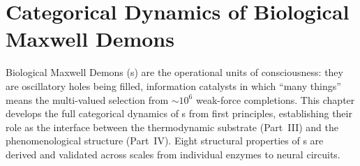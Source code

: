 \chapter{Categorical Dynamics of Biological Maxwell Demons}
\label{ch:biological_maxwell}


\begin{chapterabstract}
Biological Maxwell Demons (\BMD{}s) are the operational units of consciousness: they are oscillatory holes being filled, information catalysts in which ``many things'' means the multi-valued selection from $\sim 10^6$ weak-force completions. This chapter develops the full categorical dynamics of \BMD{}s from first principles, establishing their role as the interface between the thermodynamic substrate (Part~III) and the phenomenological structure (Part~IV). Eight structural properties of \BMD{}s are derived and validated across scales from individual enzymes to neural circuits.
\end{chapterabstract}









